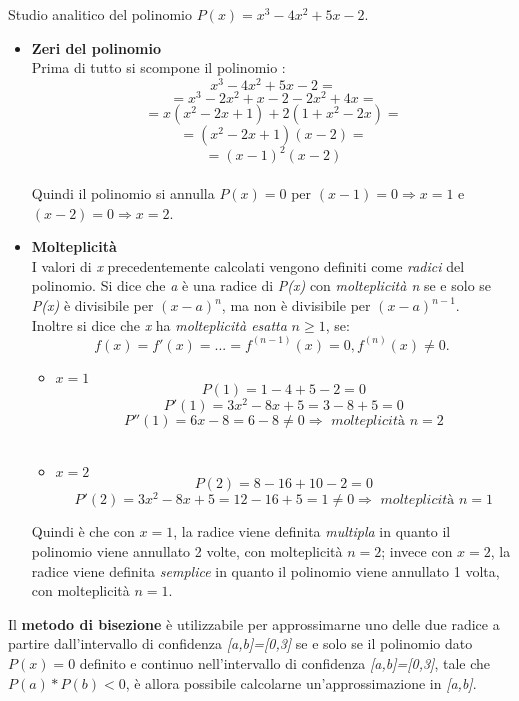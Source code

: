Studio analitico del polinomio $P(x) = x^3-4x^2+5x-2$.\\
\begin{itemize}
	\item \textbf{Zeri del polinomio}\\
		Prima di tutto si scompone il polinomio :
			\[
			\ x^3-4x^2+5x-2 =
			\] 
			\[
			\ = x^3-2x^2+x-2-2x^2+4x =
			\]
			\[
			\ = x(x^2-2x+1)+2(1+x^2-2x) =
			\]
			\[
			\ = (x^2-2x+1)(x-2) =
			\]
			\[
			\ = (x-1)^2(x-2) 
			\]\\
		Quindi il polinomio si annulla $P(x)=0$ per $(x-1)=0 \Rightarrow x=1$ e $(x-2)=0 \Rightarrow x=2$. \\
	\item \textbf{Molteplicità}\\
		I valori di \textit{x} precedentemente calcolati vengono definiti come \textit{radici} del polinomio. Si dice che \textit{a} è una radice di \textit{P(x)} con \textit{molteplicità n} se e solo se \textit{P(x)} è divisibile per $(x-a)^n$, ma non è divisibile per $(x-a)^{n-1}$.\\
		Inoltre si dice che \textit{x} ha \textit{molteplicità esatta} $n \geq 1$, se:
			\[
			f(x) = f'(x) = ... = f^{(n-1)}(x) = 0,  f^{(n)}(x) \neq 0.
			\]
			\begin{itemize}
				\item $x=1$
					\[
					P(1) = 1-4+5-2 = 0 
					\]
					\[
					P'(1) = 3x^2-8x+5 = 3-8+5 = 0 
					\]
					\[
					P''(1) = 6x-8 = 6-8 \neq 0 \Rightarrow \textit{ molteplicità } n=2
					\]\\
				\item $x=2$
					\[
					P(2) = 8-16+10-2 = 0 
					\]
					\[
					P'(2) = 3x^2-8x+5 = 12-16+5 = 1 \neq 0 \Rightarrow \textit{ molteplicità } n=1
					\]
			\end{itemize}
		Quindi è che con $x=1$, la radice viene definita \textit{multipla} in quanto il polinomio viene annullato 2 volte, con molteplicità $n=2$; invece con $x=2$, la radice viene definita \textit{semplice} in quanto il polinomio viene annullato 1 volta,  con molteplicità $n=1$.\\ 
\end{itemize}
Il \textbf{metodo di bisezione} è utilizzabile per approssimarne uno delle due radice a partire dall'intervallo di confidenza \textit{[a,b]=[0,3]} se e solo se il polinomio dato $P(x)=0$ definito e continuo nell'intervallo di confidenza \textit{[a,b]=[0,3]}, tale che $P(a)*P(b) < 0$, è allora possibile calcolarne un'approssimazione in \textit{[a,b]}.\\\\
